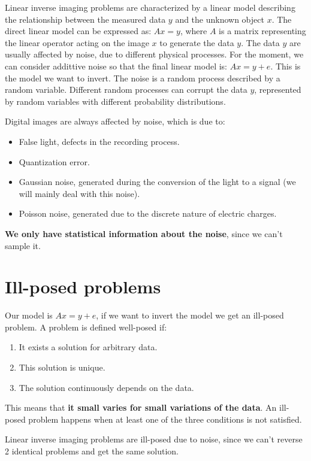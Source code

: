 \documentclass{article}
\begin{document}
Linear inverse imaging problems are characterized by a linear model describing the relationship between the measured data $y$ and the unknown object $x$.
The direct linear model can be expressed as: $Ax = y$, where $A$ is a matrix representing the linear operator acting on the image $x$ to generate the data $y$.
The data $y$ are usually affected by noise, due to different physical processes.
For the moment, we can consider addittive noise so that the final linear model is: $Ax = y+e$.
This is the model we want to invert.
The noise is a random process described by a random variable.
Different random processes can corrupt the data $y$, represented by random variables with different probability distributions.

Digital images are always affected by noise, which is due to:
\begin{itemize}
  \item False light, defects in the recording process.
  \item Quantization error.
  \item Gaussian noise, generated during the conversion of the light to a signal (we will mainly deal with this noise).
  \item Poisson noise, generated due to the discrete nature of electric charges.
\end{itemize}

\textbf{We only have statistical information about the noise}, since we can't sample it.

\section{Ill-posed problems}

Our model is $Ax=y+e$, if we want to invert the model we get an ill-posed problem.
A problem is defined well-posed if:
\begin{enumerate}
  \item It exists a solution for arbitrary data.
  \item This solution is unique.
  \item The solution continuously depends on the data.
\end{enumerate}

This means that \textbf{it small varies for small variations of the data}.
An ill-posed problem happens when at least one of the three conditions is not satisfied.

Linear inverse imaging problems are ill-posed due to noise, since we can't reverse 2 identical problems and get the same solution.
\end{document}
